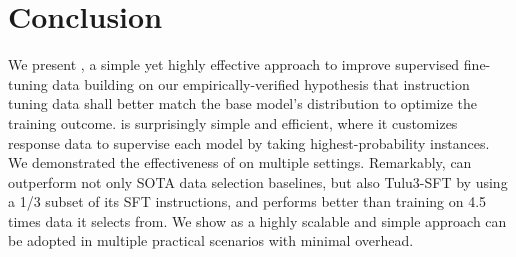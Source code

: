 \section{Conclusion}
We present \name, a simple yet highly effective approach to improve supervised fine-tuning data building on our empirically-verified hypothesis that instruction tuning data shall better match the base model's distribution to optimize the training outcome. \name is surprisingly simple and efficient, where it customizes response data to supervise each model by taking highest-probability instances. We demonstrated the effectiveness of \name on multiple settings. Remarkably, \name can outperform not only SOTA data selection baselines, but also Tulu3-SFT by using a 1/3 subset of its SFT instructions, and performs better than training on 4.5 times data it selects from. We show \name as a highly scalable and simple approach can be adopted in multiple practical scenarios with minimal overhead.


